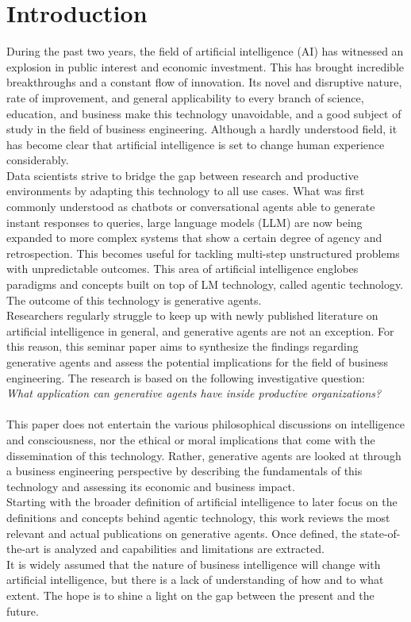 \section{Introduction}
During the past two years, the field of artificial intelligence (AI) has witnessed an explosion in public interest and economic investment. This has brought incredible breakthroughs and a constant flow of innovation. Its novel and disruptive nature, rate of improvement, and general applicability to every branch of science, education, and business make this technology unavoidable, and a good subject of study in the field of business engineering. Although a hardly understood field, it has become clear that artificial intelligence is set to change human experience considerably. \\
Data scientists strive to bridge the gap between research and productive environments by adapting this technology to all use cases. What was first commonly understood as chatbots or conversational agents able to generate instant responses to queries, large language models (LLM) are now being expanded to more complex systems that show a certain degree of agency and retrospection. This becomes useful for tackling multi-step unstructured problems with unpredictable outcomes. This area of artificial intelligence englobes paradigms and concepts built on top of LM technology, called agentic technology. The outcome of this technology is generative agents. \\ %
Researchers regularly struggle to keep up with newly published literature on artificial intelligence in general, and generative agents are not an exception. For this reason, this seminar paper aims to synthesize the findings regarding generative agents and assess the potential implications for the field of business engineering. The research is based on the following investigative question: \\
    
    \textit{What application can generative agents have inside productive organizations?} \\\\ %
This paper does not entertain the various philosophical discussions on intelligence and consciousness, nor the ethical or moral implications that come with the dissemination of this technology. Rather, generative agents are looked at through a business engineering perspective by describing the fundamentals of this technology and assessing its economic and business impact.\\
Starting with the broader definition of artificial intelligence to later focus on the definitions and concepts behind agentic technology, this work reviews the most relevant and actual publications on generative agents. Once defined, the state-of-the-art is analyzed and capabilities and limitations are extracted. \\
It is widely assumed that the nature of business intelligence will change with artificial intelligence, but there is a lack of understanding of how and to what extent. The hope is to shine a light on the gap between the present and the future.
